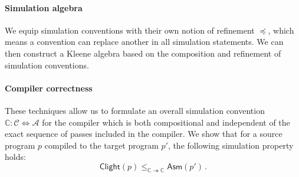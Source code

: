 \documentclass[sigplan,10pt,review,anonymous]{acmart}
\newcommand{\kw}[1]{\ensuremath{ \mathsf{#1} }}
\newcommand{\scref}{\preceq}
\begin{document}
\paragraph{Simulation algebra} %

We equip simulation conventions
with their own notion of refinement $\scref$,
which means a convention can replace another
in all simulation statements.
We can then construct a Kleene algebra
based on the composition and refinement of simulation conventions.


\paragraph{Compiler correctness} \label{sec:compcert:overview} %

These techniques allow us to formulate an overall
simulation convention
$\mathbb{C} : \mathcal{C} \Leftrightarrow \mathcal{A}$
for the compiler which is both compositional
and independent of the exact sequence of passes
included in the compiler.
We show that for a source program $p$
compiled to the target program $p'$,
the following simulation property holds:
\[
    \kw{Clight}(p)
    \le_{\mathbb{C} \twoheadrightarrow \mathbb{C}}
    \kw{Asm}(p') \,.
\]


\end{document}
